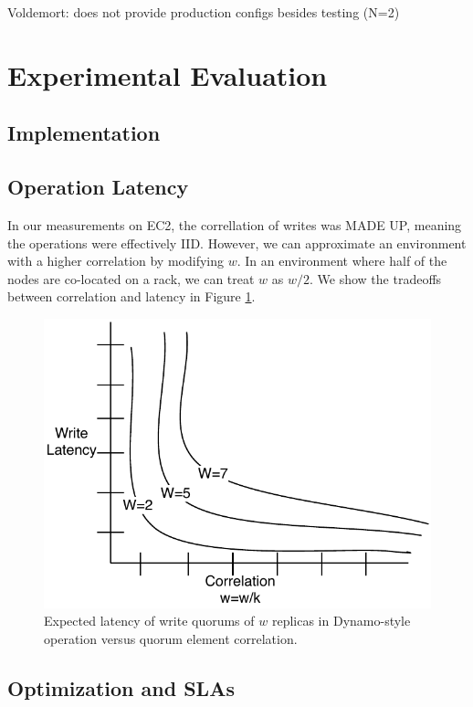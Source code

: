 \documentclass{vldb}
\begin{document}
Voldemort: does not provide production configs besides testing (N=2)

\section{Experimental Evaluation}
\label{sec:eval}

\subsection{Implementation}

\subsection{Operation Latency}
\label{sec:real-latency}

In our measurements on EC2, the correllation of writes was MADE UP,
meaning the operations were effectively IID.  However, we can
approximate an environment with a higher correlation by modifying $w$.
In an environment where half of the nodes are co-located on a rack, we can treat $w$ as $w/2$.  We show the tradeoffs between correlation and latency in Figure \ref{fig:correlation}.

\begin{figure}
\centering
\includegraphics[width=.8\columnwidth]{figs/correlation.pdf}
\caption{Expected latency of write quorums of $w$ replicas in Dynamo-style operation versus quorum element correlation.}
\label{fig:correlation}
\end{figure}

\subsection{Optimization and SLAs}
\label{sec:optimization}
\end{document}
